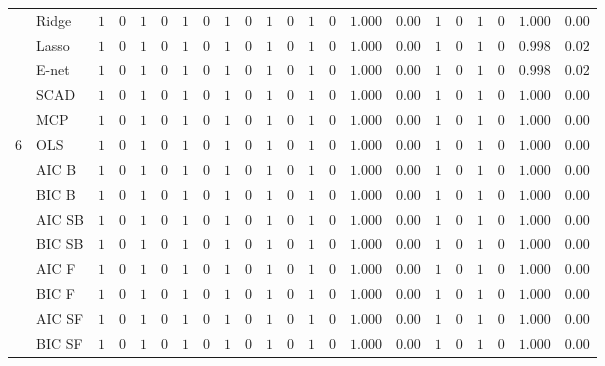 \begin{tabular}{ll|ll|llllll|llllll|llllll}
 & Ridge  & $1$ & $0$ & $1$ & $0$ & $1$ & $0$ & $1$ & $0$ & $1$ & $0$ & $1$ & $0$ & $1.000$ & $0.00$ & $1$ & $0$ & $1$ & $0$ & $1.000$ & $0.00$ \\
 & Lasso  & $1$ & $0$ & $1$ & $0$ & $1$ & $0$ & $1$ & $0$ & $1$ & $0$ & $1$ & $0$ & $1.000$ & $0.00$ & $1$ & $0$ & $1$ & $0$ & $0.998$ & $0.02$ \\
 & E-net  & $1$ & $0$ & $1$ & $0$ & $1$ & $0$ & $1$ & $0$ & $1$ & $0$ & $1$ & $0$ & $1.000$ & $0.00$ & $1$ & $0$ & $1$ & $0$ & $0.998$ & $0.02$ \\
 & SCAD  & $1$ & $0$ & $1$ & $0$ & $1$ & $0$ & $1$ & $0$ & $1$ & $0$ & $1$ & $0$ & $1.000$ & $0.00$ & $1$ & $0$ & $1$ & $0$ & $1.000$ & $0.00$ \\
 & MCP  & $1$ & $0$ & $1$ & $0$ & $1$ & $0$ & $1$ & $0$ & $1$ & $0$ & $1$ & $0$ & $1.000$ & $0.00$ & $1$ & $0$ & $1$ & $0$ & $1.000$ & $0.00$ \\\hline
6 & OLS  & $1$ & $0$ & $1$ & $0$ & $1$ & $0$ & $1$ & $0$ & $1$ & $0$ & $1$ & $0$ & $1.000$ & $0.00$ & $1$ & $0$ & $1$ & $0$ & $1.000$ & $0.00$ \\
 & AIC B  & $1$ & $0$ & $1$ & $0$ & $1$ & $0$ & $1$ & $0$ & $1$ & $0$ & $1$ & $0$ & $1.000$ & $0.00$ & $1$ & $0$ & $1$ & $0$ & $1.000$ & $0.00$ \\
 & BIC B  & $1$ & $0$ & $1$ & $0$ & $1$ & $0$ & $1$ & $0$ & $1$ & $0$ & $1$ & $0$ & $1.000$ & $0.00$ & $1$ & $0$ & $1$ & $0$ & $1.000$ & $0.00$ \\
 & AIC SB  & $1$ & $0$ & $1$ & $0$ & $1$ & $0$ & $1$ & $0$ & $1$ & $0$ & $1$ & $0$ & $1.000$ & $0.00$ & $1$ & $0$ & $1$ & $0$ & $1.000$ & $0.00$ \\
 & BIC SB  & $1$ & $0$ & $1$ & $0$ & $1$ & $0$ & $1$ & $0$ & $1$ & $0$ & $1$ & $0$ & $1.000$ & $0.00$ & $1$ & $0$ & $1$ & $0$ & $1.000$ & $0.00$ \\
 & AIC F  & $1$ & $0$ & $1$ & $0$ & $1$ & $0$ & $1$ & $0$ & $1$ & $0$ & $1$ & $0$ & $1.000$ & $0.00$ & $1$ & $0$ & $1$ & $0$ & $1.000$ & $0.00$ \\
 & BIC F  & $1$ & $0$ & $1$ & $0$ & $1$ & $0$ & $1$ & $0$ & $1$ & $0$ & $1$ & $0$ & $1.000$ & $0.00$ & $1$ & $0$ & $1$ & $0$ & $1.000$ & $0.00$ \\
 & AIC SF  & $1$ & $0$ & $1$ & $0$ & $1$ & $0$ & $1$ & $0$ & $1$ & $0$ & $1$ & $0$ & $1.000$ & $0.00$ & $1$ & $0$ & $1$ & $0$ & $1.000$ & $0.00$ \\
 & BIC SF  & $1$ & $0$ & $1$ & $0$ & $1$ & $0$ & $1$ & $0$ & $1$ & $0$ & $1$ & $0$ & $1.000$ & $0.00$ & $1$ & $0$ & $1$ & $0$ & $1.000$ & $0.00$ \\

\end{tabular}

